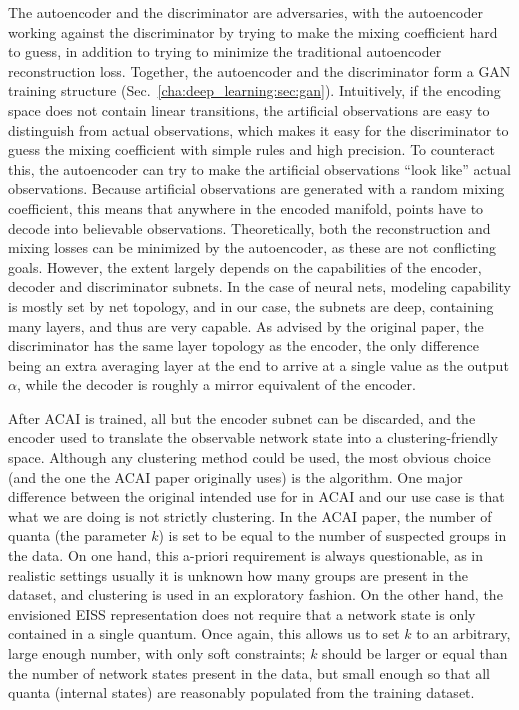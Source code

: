 			The autoencoder and the discriminator are adversaries, with the autoencoder working against the discriminator by trying to make the mixing coefficient hard to guess, in addition to trying to minimize the traditional autoencoder reconstruction loss. 
			Together, the autoencoder and the discriminator form a \ac{GAN} training structure (Sec.~\ref{cha:deep_learning:sec:gan}).
			Intuitively, if the encoding space does not contain linear transitions, the artificial observations are easy to distinguish from actual observations, which makes it easy for the discriminator to guess the mixing coefficient with simple rules and high precision. 
			To counteract this, the autoencoder can try to make the artificial observations ``look like'' actual observations. 
			Because artificial observations are generated with a random mixing coefficient, this means that anywhere in the encoded manifold, points have to decode into believable observations. 
			Theoretically, both the reconstruction and mixing losses can be minimized by the autoencoder, as these are not conflicting goals.
			However, the extent largely depends on the capabilities of the encoder, decoder and discriminator subnets.
			In the case of neural nets, modeling capability is mostly set by net topology, and in our case, the subnets are deep, containing many layers, and thus are very capable. 
			As advised by the original paper, the discriminator has the same layer topology as the encoder, the only difference being an extra averaging layer at the end to arrive at a single value as the output $\alpha$, while the decoder is roughly a mirror equivalent of the encoder.	
			
			After \ac{ACAI} is trained, all but the encoder subnet can be discarded, and the encoder used to translate the observable network state into a clustering-friendly space. 
			Although any clustering method could be used, the most obvious choice (and the one the \ac{ACAI} paper originally uses) is the \kmeans{} algorithm. 
			One major difference between the original intended use for \kmeans{} in \ac{ACAI} and our use case is that what we are doing is not strictly clustering. 
			In the \ac{ACAI} paper, the number of quanta (the parameter $k$) is set to be equal to the number of suspected groups in the data. 
			On one hand, this a-priori requirement is always questionable, as in realistic settings usually it is unknown how many groups are present in the dataset, and clustering is used in an exploratory fashion. 
			On the other hand, the envisioned \ac{EISS} representation does not require that a network state is only contained in a single quantum. 
			Once again, this allows us to set $k$ to an arbitrary, large enough number, with only soft constraints; $k$ should be larger or equal than the number of network states present in the data, but small enough so that all quanta (internal states) are reasonably populated from the training dataset.
				
